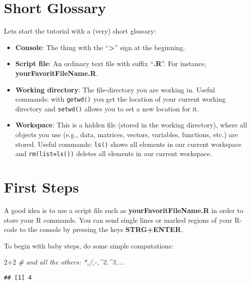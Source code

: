 \documentclass[
]{book}
\newenvironment{Shaded}{\begin{snugshade}}{\end{snugshade}}
\newcommand{\CommentTok}[1]{\textcolor[rgb]{0.56,0.35,0.01}{\textit{#1}}}
\newcommand{\DecValTok}[1]{\textcolor[rgb]{0.00,0.00,0.81}{#1}}
\newcommand{\SpecialCharTok}[1]{\textcolor[rgb]{0.00,0.00,0.00}{#1}}
\providecommand{\tightlist}{%
  \setlength{\itemsep}{0pt}\setlength{\parskip}{0pt}}
\begin{document}
\hypertarget{short-glossary}{%
\section{Short Glossary}\label{short-glossary}}

Lets start the tutorial with a (very) short glossary:

\begin{itemize}
\tightlist
\item
  \textbf{Console}: The thing with the ``\textbf{\textgreater{}}'' sign at the beginning.
\item
  \textbf{Script file}: An ordinary text file with suffix ``\textbf{.R}''. For instance, \textbf{yourFavoritFileName.R}.
\item
  \textbf{Working directory}: The file-directory you are working in. Useful commands: with \texttt{getwd()} you get the location of your current working directory and \texttt{setwd()} allows you to set a new location for it.
\item
  \textbf{Workspace}: This is a hidden file (stored in the working directory), where all objects you use (e.g., data, matrices, vectors, variables, functions, etc.) are stored. Useful commands: \texttt{ls()} shows all elements in our current workspace and \texttt{rm(list=ls())} deletes all elements in our current workspace.
\end{itemize}

\hypertarget{first-steps}{%
\section{First Steps}\label{first-steps}}

A good idea is to use a script file such as \textbf{yourFavoritFileName.R} in order to store your R commands. You can send single lines or marked regions of your R-code to the console by pressing the keys \textbf{STRG+ENTER}.

To begin with baby steps, do some simple computations:

\begin{Shaded}
\begin{Highlighting}[]
\DecValTok{2}\SpecialCharTok{+}\DecValTok{2} \CommentTok{\# and all the others: *,/,{-},\^{}2,\^{}3,... }
\end{Highlighting}
\end{Shaded}

\begin{verbatim}
## [1] 4
\end{verbatim}
\end{document}
